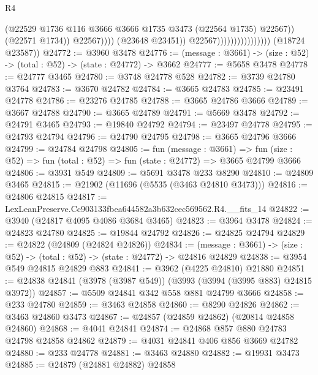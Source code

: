 \begin{lexlean}{R4}
\begin{coremodule}
                                                    (@22529
                                                      @1736
                                                      @116
                                                      @3666
                                                      @3666
                                                      @1735
                                                      @3473
                                                      (@22564 @1735)
                                                      @22567))
                                                  (@22571 @1734))
                                                @22567))))
                                        (@23648 @23451))
                                      @22567))))))))))))))))
      (@18724 @23587))
@24772 := @3960 @3478
@24776 := (message : @3661) -> (size : @52) -> (total : @52) -> (state : @24772) -> @3662
@24777 := @5658 @3478
@24778 := @24777 @3465
@24780 := @3748 @24778 @528
@24782 := @3739 @24780 @3764
@24783 := @3670 @24782
@24784 := @3665 @24783
@24785 := @23491 @24778
@24786 := @23276 @24785
@24788 := @3665 @24786 @3666
@24789 := @3667 @24788
@24790 := @3665 @24789
@24791 := @5669 @3478
@24792 := @24791 @3465
@24793 := @19840 @24792
@24794 := @23497 @24778
@24795 := @24793 @24794
@24796 := @24790 @24795
@24798 := @3665 @24796 @3666
@24799 := @24784 @24798
@24805 := fun (message : @3661) =>
  fun (size : @52) => fun (total : @52) => fun (state : @24772) => @3665 @24799 @3666
@24806 := @3931 @549
@24809 := @5691 @3478 @233 @8290
@24810 := @24809 @3465
@24815 := @21902 (@11696 (@5535 (@3463 @24810 @3473)))
@24816 := @24806 @24815
@24817 := LexLeanPreserve.Cc903133fbea644582a3b632cec569562.R4.__fits_14
@24822 := @3940 (@24817 @4095 @4086 @3684 @3465)
@24823 := @3964 @3478
@24824 := @24823 @24780
@24825 := @19844 @24792
@24826 := @24825 @24794
@24829 := @24822 (@24809 (@24824 @24826))
@24834 := (message : @3661) -> (size : @52) -> (total : @52) -> (state : @24772) -> @24816 @24829
@24838 := @3954 @549 @24815 @24829 @883
@24841 := @3962 (@4225 @24810) @21880
@24851 := @24838 @24841 (@3978 (@3987 @549)) (@3993 (@3994 (@3995 @883) @24815 @3972))
@24857 := @5509 @24841 @342 @558 @881 @24799 @3666
@24858 := @233 @24780
@24859 := @3463 @24858
@24860 := @8290 @24826
@24862 := @3463 @24860 @3473
@24867 := @24857 (@24859 @24862) (@20814 @24858 @24860)
@24868 := @4041 @24841
@24874 := @24868 @857 @880 @24783 @24798 @24858 @24862
@24879 := @4031 @24841 @406 @856 @3669 @24782
@24880 := @233 @24778
@24881 := @3463 @24880
@24882 := @19931 @3473
@24885 := @24879 (@24881 @24882) @24858

\end{coremodule}
\end{lexlean}
